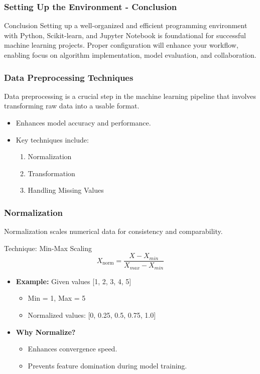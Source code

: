 \documentclass[aspectratio=169]{beamer}
\begin{document}
\begin{frame}[fragile]
  \frametitle{Setting Up the Environment - Conclusion}
  \begin{block}{Conclusion}
  Setting up a well-organized and efficient programming environment with Python, Scikit-learn, and Jupyter Notebook is foundational for successful machine learning projects. Proper configuration will enhance your workflow, enabling focus on algorithm implementation, model evaluation, and collaboration.
  \end{block}
\end{frame}

\begin{frame}
    \frametitle{Data Preprocessing Techniques}
    Data preprocessing is a crucial step in the machine learning pipeline that involves transforming raw data into a usable format.

    \begin{itemize}
        \item Enhances model accuracy and performance.
        \item Key techniques include:
        \begin{enumerate}
            \item Normalization
            \item Transformation
            \item Handling Missing Values
        \end{enumerate}
    \end{itemize}
\end{frame}

\begin{frame}[fragile]
    \frametitle{Normalization}
    Normalization scales numerical data for consistency and comparability.

    \begin{block}{Technique: Min-Max Scaling}
        \begin{equation}
        X_{\text{norm}} = \frac{X - X_{min}}{X_{max} - X_{min}}
        \end{equation}
    \end{block}

    \begin{itemize}
        \item \textbf{Example:} Given values [1, 2, 3, 4, 5]
        \begin{itemize}
            \item Min = 1, Max = 5
            \item Normalized values: [0, 0.25, 0.5, 0.75, 1.0]
        \end{itemize}
        \item \textbf{Why Normalize?}
        \begin{itemize}
            \item Enhances convergence speed.
            \item Prevents feature domination during model training.
        \end{itemize}
    \end{itemize}
\end{frame}
\end{document}
